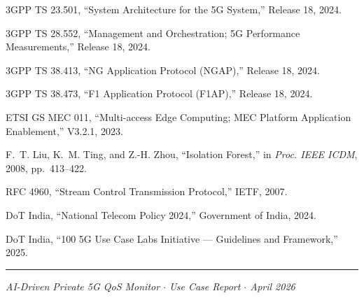 \documentclass[11pt, a4paper]{article}
\begin{document}
\begin{enumerate}[label={[\arabic*]}, leftmargin=2em, itemsep=3pt]
    \item 3GPP TS 23.501, ``System Architecture for the 5G System,'' Release 18, 2024.
    \item 3GPP TS 28.552, ``Management and Orchestration; 5G Performance Measurements,'' Release 18, 2024.
    \item 3GPP TS 38.413, ``NG Application Protocol (NGAP),'' Release 18, 2024.
    \item 3GPP TS 38.473, ``F1 Application Protocol (F1AP),'' Release 18, 2024.
    \item ETSI GS MEC 011, ``Multi-access Edge Computing; MEC Platform Application Enablement,'' V3.2.1, 2023.
    \item F.~T. Liu, K.~M. Ting, and Z.-H. Zhou, ``Isolation Forest,'' in \emph{Proc. IEEE ICDM}, 2008, pp.~413--422.
    \item RFC 4960, ``Stream Control Transmission Protocol,'' IETF, 2007.
    \item DoT India, ``National Telecom Policy 2024,'' Government of India, 2024.
    \item DoT India, ``100 5G Use Case Labs Initiative --- Guidelines and Framework,'' 2025.
\end{enumerate}

\vspace{12pt}
\noindent\rule{\textwidth}{0.8pt}
\begin{center}
    \small\itshape
    AI-Driven Private 5G QoS Monitor $\cdot$ Use Case Report $\cdot$ April 2026
\end{center}
\end{document}

